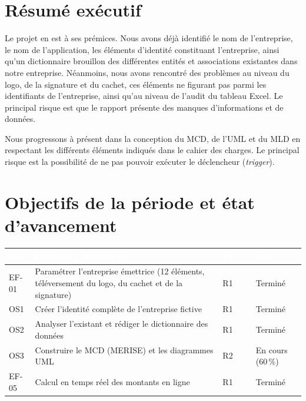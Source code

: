 \documentclass[11pt,a4paper]{article}
\newcommand{\entete}[1]{\textcolor{white}{\textbf{#1}}}
\begin{document}
\section{Résumé exécutif}

Le projet en est à ses prémices. Nous avons déjà identifié le nom de
l'entreprise, le nom de l'application, les éléments d'identité constituant
l'entreprise, ainsi qu'un dictionnaire brouillon des différentes entités et
associations existantes dans notre entreprise. Néanmoins, nous avons rencontré
des problèmes au niveau du logo, de la signature et du cachet, ces éléments ne
figurant pas parmi les identifiants de l'entreprise, ainsi qu'au niveau de
l'audit du tableau Excel. Le principal risque est que le rapport présente des
manques d'informations et de données.

Nous progressons à présent dans la conception du MCD, de l'UML et du MLD en
respectant les différents éléments indiqués dans le cahier des charges. Le
principal risque est la possibilité de ne pas pouvoir exécuter le déclencheur
(\textit{trigger}).

\section{Objectifs de la période et état d'avancement}

\begin{longtable}{|C{1.5cm}|L{8cm}|C{1.5cm}|C{3cm}|}
\hline
{}
\entete{Réf} & \entete{Objectifs / Exigences} & \entete{Prévu} & \entete{État} \\
\hline
\endhead
EF-01 & Paramétrer l'entreprise émettrice (12 éléments, téléversement du
        logo, du cachet et de la signature) & R1 & Terminé \\ \hline
OS1 & Créer l'identité complète de l'entreprise fictive & R1 & Terminé \\ \hline
OS2 & Analyser l'existant et rédiger le dictionnaire des données & R1 &
      Terminé \\ \hline
OS3 & Construire le MCD (MERISE) et les diagrammes UML & R2 &
      En cours (60\,\%) \\ \hline
EF-05 & Calcul en temps réel des montants en ligne & R1 & Terminé \\ \hline
\end{longtable}
\end{document}

